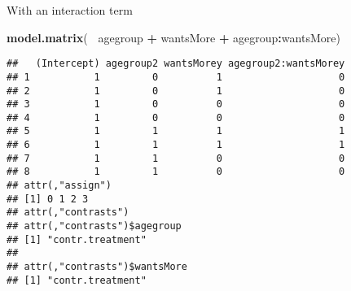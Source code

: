 \documentclass[
  ignorenonframetext,
]{beamer}
\newenvironment{Shaded}{\begin{snugshade}}{\end{snugshade}}
\newcommand{\KeywordTok}[1]{\textcolor[rgb]{0.13,0.29,0.53}{\textbf{#1}}}
\newcommand{\NormalTok}[1]{#1}
\newcommand{\OperatorTok}[1]{\textcolor[rgb]{0.81,0.36,0.00}{\textbf{#1}}}
\newcommand{\StringTok}[1]{\textcolor[rgb]{0.31,0.60,0.02}{#1}}
\begin{document}
\begin{frame}[fragile]{With an interaction term}
\protect\hypertarget{with-an-interaction-term}{}

\tiny

\begin{Shaded}
\begin{Highlighting}[]
\KeywordTok{model.matrix}\NormalTok{(}\OperatorTok{~}\StringTok{ }\NormalTok{agegroup }\OperatorTok{+}\StringTok{ }\NormalTok{wantsMore }\OperatorTok{+}\StringTok{ }\NormalTok{agegroup}\OperatorTok{:}\NormalTok{wantsMore)}
\end{Highlighting}
\end{Shaded}

\begin{verbatim}
##   (Intercept) agegroup2 wantsMorey agegroup2:wantsMorey
## 1           1         0          1                    0
## 2           1         0          1                    0
## 3           1         0          0                    0
## 4           1         0          0                    0
## 5           1         1          1                    1
## 6           1         1          1                    1
## 7           1         1          0                    0
## 8           1         1          0                    0
## attr(,"assign")
## [1] 0 1 2 3
## attr(,"contrasts")
## attr(,"contrasts")$agegroup
## [1] "contr.treatment"
## 
## attr(,"contrasts")$wantsMore
## [1] "contr.treatment"
\end{verbatim}

\end{frame}
\end{document}
